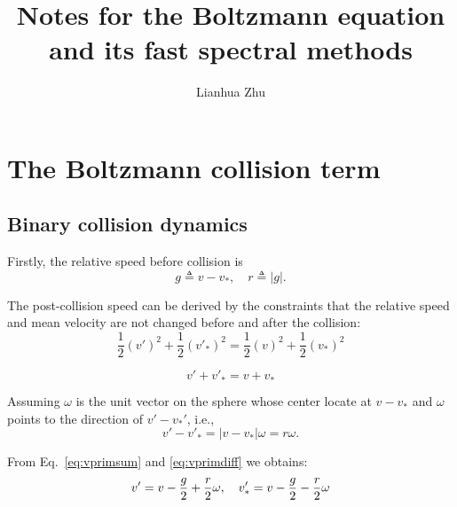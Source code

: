 \documentclass[11pt]{amsart}
\title{Notes for the Boltzmann equation and its fast spectral methods}
\author{Lianhua Zhu}
\begin{document}
\maketitle
\section{The Boltzmann collision term}
\subsection{Binary collision dynamics}



Firstly, the relative speed before collision is
\begin{equation}
g \triangleq v-v_*, \quad r \triangleq |g|.
\end{equation}

The post-collision speed can be derived by the constraints that the relative speed and mean velocity  are not changed before and after the collision:
\begin{equation}
\frac{1}{2} (v')^2 + \frac{1}{2}(v'_*)^2 = \frac{1}{2} (v)^2 + \frac{1}{2}(v_*)^2
\end{equation}

\begin{equation}\label{eq:vprimsum}
v' + v'_* = v + v_*
\end{equation}

Assuming $\omega$ is the unit vector on the sphere whose center locate at $v-v_*$ and $\omega$ points to the direction of $v'-v_*'$, i.e.,
\begin{equation}\label{eq:vprimdiff}
v' - v'_* =  |v-v_*| \omega = r\omega.
\end{equation}

From Eq.~\eqref{eq:vprimsum} and \eqref{eq:vprimdiff} we obtains:
\begin{equation}
v' = v - {g\over2} + {r\over2} \omega,\quad v'_* = v - {g\over2} - {r\over2} \omega
\end{equation}


\end{document}
